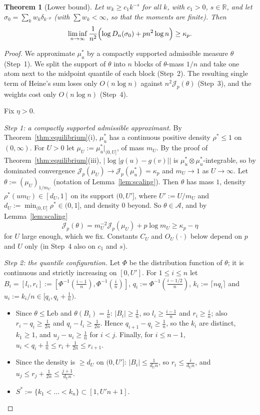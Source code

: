 \documentclass{amsart}
\newtheorem{theorem}{Theorem}[section]
\theoremstyle{definition}
\theoremstyle{remark}
\numberwithin{equation}{section}
\newcommand{\R}{\mathbb{R}}
\newcommand{\cA}{\mathcal{A}}
\newcommand{\cJ}{\mathcal{J}}
\newcommand{\Leb}{\mathrm{Leb}}
\begin{document}
\begin{theorem}[Lower bound]\label{thm:lower}
Let $w_k\ge c_1k^{-s}$ for all $k$, with $c_1>0$, $s\in\R$, and let $\sigma_0=\sum_kw_k\delta_{k^{-p}}$ (with
$\sum w_k<\infty$, so that the moments are finite). Then
\[
  \liminf_{n\to\infty}\frac1{n^2}\Bigl(\log D_n(\sigma_0)+pn^2\log n\Bigr)\ge\kappa_p .
\]
\end{theorem}

\begin{proof}
We approximate $\mu^*_u$ by a compactly supported admissible measure $\theta$ (Step~1). We split the support of
$\theta$ into $n$ blocks of $\theta$-mass $1/n$ and take one atom next to the midpoint quantile of each block (Step~2).
The resulting single term of Heine's sum loses only $O(n\log n)$ against $n^2\cJ_p(\theta)$ (Step~3), and the
weights cost only $O(n\log n)$ (Step~4).

Fix $\eta>0$.

\emph{Step 1: a compactly supported admissible approximant.} By Theorem~\ref{thm:equilibrium}(i), $\mu^*_u$ has a
continuous positive density $\rho^*\le1$ on $(0,\infty)$. For $U>0$ let $\mu_U:=\mu^*_u|_{(0,U]}$, of mass $m_U$. By
the proof of Theorem~\ref{thm:equilibrium}(iii), $|\log|g(u)-g(v)||$ is $\mu^*_u\otimes\mu^*_u$-integrable, so
by dominated convergence $\cJ_p(\mu_U)\to\cJ_p(\mu^*_u)=\kappa_p$ and $m_U\to1$ as $U\to\infty$. Let
$\theta:=(\mu_U)_{1/m_U}$ (notation of Lemma~\ref{lem:scaling}). Then $\theta$ has mass $1$, density
$\rho^*(um_U)\in[d_U,1]$ on its support $(0,U']$, where $U':=U/m_U$ and $d_U:=\min_{(0,U]}\rho^*\in(0,1]$, and density
$0$ beyond. So $\theta\in\cA$, and by Lemma~\ref{lem:scaling}
\[
  \cJ_p(\theta)=m_U^{-2}\cJ_p(\mu_U)+p\log m_U\ge\kappa_p-\eta
\]
for $U$ large enough, which we fix. Constants $C_U$ and $O_U(\cdot)$ below depend on $p$ and $U$ only (in
Step~4 also on $c_1$ and $s$).

\emph{Step 2: the quantile configuration.} Let $\Phi$ be the distribution function of $\theta$; it is continuous and
strictly increasing on $[0,U']$. For $1\le i\le n$ let $B_i=[l_i,r_i]:=[\Phi^{-1}(\frac{i-1}{n}),\Phi^{-1}(\frac in)]$,
$q_i:=\Phi^{-1}(\frac{i-1/2}{n})$, $k_i:=\lceil nq_i\rceil$ and $u_i:=k_i/n\in[q_i,q_i+\frac1n)$.
\begin{itemize}
\item Since $\theta\le\Leb$ and $\theta(B_i)=\frac1n$: $|B_i|\ge\frac1n$, so $l_i\ge\frac{i-1}{n}$ and
  $r_i\ge\frac in$; also $r_i-q_i\ge\frac1{2n}$ and $q_i-l_i\ge\frac1{2n}$. Hence $q_{i+1}-q_i\ge\frac1n$, so the $k_i$
  are distinct, $k_1\ge1$, and $u_j-u_i\ge\frac1n$ for $i<j$. Finally, for $i\le n-1$, $u_i<q_i+\frac1n\le r_i+\frac1{2n}\le r_{i+1}$.
\item Since the density is $\ge d_U$ on $(0,U']$: $|B_i|\le\frac1{d_Un}$, so $r_i\le\frac{i}{d_Un}$, and
  $u_j\le r_j+\frac1{2n}\le\frac{j+1}{d_Un}$.
\item $S^*:=\{k_1<\dots<k_n\}\subset[1,U'n+1]$.
\end{itemize}


\end{proof}
\end{document}
